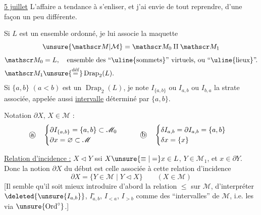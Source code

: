 
\uline{5 juillet} L'affaire a tendance à s'enliser, et j'ai envie de tout reprendre, d'une façon  un peu différente.

 Si $L$ est un ensemble ordonné, je lui associe la maquette 
\[
\unsure{\mathscr M|\mathcal M}=\mathscr M_0\amalg\mathscr M_1
\]
\[
\begin{aligned}
\mathscr M_0&=L,\quad\text{ensemble des ``\uline{sommets}'' virtuels, ou ``\uline{lieux}''.}\\
\mathscr M_1&\unsure{\overset{\mathrm{d\acute ef}}{=}}\operatorname{Drap}_2(L).
\end{aligned}
\]
Si $\{a,b\}$ $(a<b)$ est un $\operatorname{Drap}_2(L)$, je note $I_{\{a,b\}}$ ou $I_{a,b}$ ou $I_{b,a}$ la strate associée, appelée aussi \uline{intervalle} déterminé par $\{a,b\}$.


Notation $\partial X$, $X\in\mathscr M$ :
\[
\text{\textcircled{a}}\quad
\begin{cases}
\partial I_{\{a,b\}}=\{a,b\}\subset\mathscr M_0\\
\partial x=\varnothing\subset\mathscr M
\end{cases}
\qquad
\text{\textcircled{b}}\quad
\begin{cases}
\delta I_{a,b}=\partial I_{a,b}=\{a,b\}\\
\delta x=\{x\}
\end{cases}
\]
\margin{support ``naïf''\par
$c\ \left\{\begin{aligned}|I_{a,b}|^{\unsure{\circ}}&=[a,b]=\{x\in L\mid a\leq x\unsure{\leq b}\}\\|a|&=\{a\}\end{aligned}\right.$\par
$d)\quad |X|^\circ=|X|\setminus\partial X\ \begin{cases}]a,b[&\text{si }X=\unsure{I_{a,b}}\\\{a\}&\text{si }X=a\end{cases}$\par
Notons, pour $X\in\mathscr M$, $\delta X$ et $\partial X\subset L$, mais $\partial X\subset\delta X$.}

\uline{Relation d'incidence :} $X\triangleleft Y$ ssi $X\unsure{\equiv|=}x\in L$, $Y\in\mathscr M_1$, et $x\in\partial Y$. Donc la notion $\partial X$ du début est celle associée à cette relation d'incidence
\[
\partial X=\{Y\in\mathscr M\mid Y\triangleleft X\}\qquad(X\in\mathscr M)
\]
[Il semble qu'il soit mieux introduire d'abord la relation $\leq$ sur $\mathscr M$, d'interpréter $\deleted{\unsure{I_{a,b}}}$, $I_{a,b}^\circ$, $I_{<a}$, $I_{>b}$ comme des ``intervalles'' de $\mathscr M$, i.e. les  via $\unsure{\mathrm{Ord}^\circ}$.]

